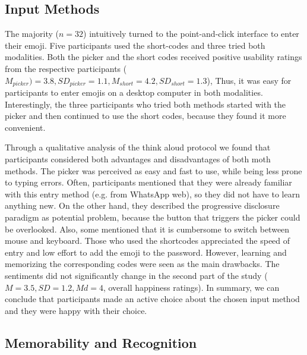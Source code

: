 \subsection{Input Methods}
The majority ($n=32$) intuitively turned to the point-and-click interface to enter their emoji. Five participants used the short-codes and three tried both modalities. Both the picker and the short codes received positive usability ratings from the respective participants ($M_{picker})=3.8, SD_{picker}=1.1, M_{short}=4.2, SD_{short}=1.3$),  Thus, it was easy for participants to enter emojis on a desktop computer in both modalities. Interestingly, the three participants who tried both methods started with the picker and then continued to use the short codes, because they found it more convenient.

Through a qualitative analysis of the think aloud protocol we found that participants considered both advantages and disadvantages of both moth methods. The picker was perceived as easy and fast to use, while being less prone to typing errors. Often, participants mentioned that they were already familiar with this entry method (e.g. from WhatsApp web), so they did not have to learn anything new. On the other hand, they described the progressive disclosure paradigm as potential problem, because the button that triggers the picker could be overlooked. Also, some mentioned that it is cumbersome to switch between mouse and keyboard. Those who used the shortcodes appreciated the speed of entry and low effort to add the emoji to the password. However, learning and memorizing the corresponding codes were seen as the main drawbacks. The sentiments did not significantly change in the second part of the study ($M=3.5, SD=1.2, Md=4$, overall happiness ratings). In summary, we can conclude that participants made an active choice about the chosen input method and they were happy with their choice. %

\subsection{Memorability and Recognition}
